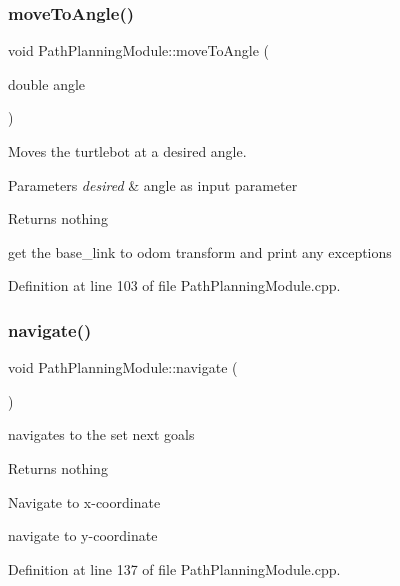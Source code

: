 \subsubsection{\texorpdfstring{move\+To\+Angle()}{moveToAngle()}}
{\footnotesize\ttfamily void Path\+Planning\+Module\+::move\+To\+Angle (\begin{DoxyParamCaption}\item[{double}]{angle }\end{DoxyParamCaption})}



Moves the turtlebot at a desired angle. 


\begin{DoxyParams}{Parameters}
{\em desired} & angle as input parameter\\
\hline
\end{DoxyParams}
\begin{DoxyReturn}{Returns}
nothing 
\end{DoxyReturn}
get the base\+\_\+link to odom transform and print any exceptions 

Definition at line 103 of file Path\+Planning\+Module.\+cpp.

\mbox{\label{class_path_planning_module_a31e1be6e29e2acd14e492c6c60104f56}} 
\subsubsection{\texorpdfstring{navigate()}{navigate()}}
{\footnotesize\ttfamily void Path\+Planning\+Module\+::navigate (\begin{DoxyParamCaption}{ }\end{DoxyParamCaption})}



navigates to the set next goals 

\begin{DoxyReturn}{Returns}
nothing 
\end{DoxyReturn}
Navigate to x-\/coordinate

navigate to y-\/coordinate 

Definition at line 137 of file Path\+Planning\+Module.\+cpp.

\mbox{\label{class_path_planning_module_a53bc600d54e6196a36e616fabb1e2c93}} 
